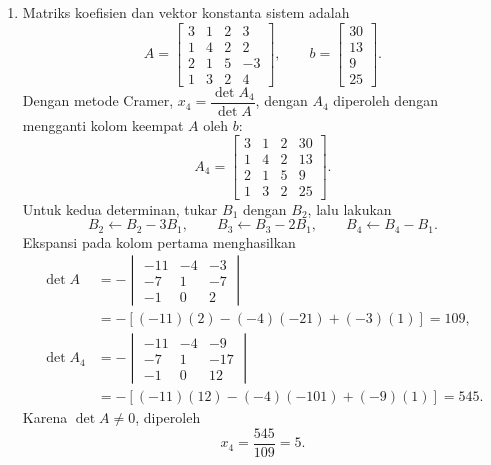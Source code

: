 \documentclass[11pt,a4paper]{article}
\begin{document}
\begin{enumerate}
    \newpage
    \item Matriks koefisien dan vektor konstanta sistem adalah
    \[
        A=\begin{bmatrix}
            3&1&2&3\\1&4&2&2\\2&1&5&-3\\1&3&2&4
        \end{bmatrix},
        \qquad
        b=\begin{bmatrix}30\\13\\9\\25\end{bmatrix}.
    \]
    Dengan metode Cramer, $x_4=\dfrac{\det A_4}{\det A}$, dengan $A_4$ diperoleh dengan mengganti kolom keempat $A$ oleh $b$:
    \[
        A_4=\begin{bmatrix}
            3&1&2&30\\1&4&2&13\\2&1&5&9\\1&3&2&25
        \end{bmatrix}.
    \]
    Untuk kedua determinan, tukar $B_1$ dengan $B_2$, lalu lakukan
    \[
        B_2\leftarrow B_2-3B_1,\qquad
        B_3\leftarrow B_3-2B_1,\qquad
        B_4\leftarrow B_4-B_1.
    \]
    Ekspansi pada kolom pertama menghasilkan
    \begin{align*}
        \det A
            &=-\begin{vmatrix}-11&-4&-3\\-7&1&-7\\-1&0&2\end{vmatrix}\\
            &=-\left[(-11)(2)-(-4)(-21)+(-3)(1)\right]
            =109,\\
        \det A_4
            &=-\begin{vmatrix}-11&-4&-9\\-7&1&-17\\-1&0&12\end{vmatrix}\\
            &=-\left[(-11)(12)-(-4)(-101)+(-9)(1)\right]
            =545.
    \end{align*}
    Karena $\det A\neq0$, diperoleh
    \[
        \boxed{x_4=\frac{545}{109}=5}.
    \]
\end{enumerate}
\end{document}
